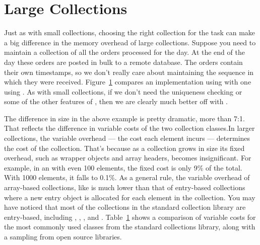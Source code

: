 



\section{Large Collections}

Just as with small collections, choosing the right collection for the task
can make a big difference in the memory overhead of large collections.  Suppose
you need to maintain a collection of all the orders processed for the day.  At
the end of the day these orders are posted in bulk to a remote database. The orders
contain their own timestamps, so we don't really care about maintaining the
sequence in which they were received. Figure~\ref{} compares an implementation
using  with one using . As with small
collections, if we don't need the uniqueness checking or some of the other features of , 
then we are clearly much better off with .

The difference in size in the above example
is pretty dramatic, more than 7:1. That reflects the difference in variable
costs of the two collection classes.In larger collections, the variable overhead --- the cost each
element incurs --- determines the cost of the collection. That's because as a
collection grows in size its fixed overhead, such as wrapper objects and array
headers, becomes insignificant. For example, in an  with
even 100 elements, the fixed cost is only 9\% of the total. With 1000
elements, it falls to 0.1\%.
As a general rule,
the variable overhead of array-based collections, like  is much lower than that of 
entry-based collections where a new entry
object is allocated for each element in the collection. You may have noticed
that most of the collections in the standard collection library are entry-based,
including , , , and . Table~\ref{} shows a
comparison of variable costs for the most commonly used classes from the standard collections library, 
along with a sampling from open source libraries.


